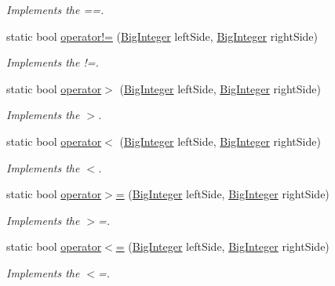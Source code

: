 \begin{DoxyCompactItemize}
\begin{DoxyCompactList}\small\item\em Implements the ==. \end{DoxyCompactList}\item 
static bool \hyperlink{class_scott_garland_1_1_big_integer_a55d1606d8b5694c6f6cd69aa658e1ad6}{operator!=} (\hyperlink{class_scott_garland_1_1_big_integer}{Big\+Integer} left\+Side, \hyperlink{class_scott_garland_1_1_big_integer}{Big\+Integer} right\+Side)
\begin{DoxyCompactList}\small\item\em Implements the !=. \end{DoxyCompactList}\item 
static bool \hyperlink{class_scott_garland_1_1_big_integer_a3d6351f6e8a56bb19b48fa232308f0b2}{operator$>$} (\hyperlink{class_scott_garland_1_1_big_integer}{Big\+Integer} left\+Side, \hyperlink{class_scott_garland_1_1_big_integer}{Big\+Integer} right\+Side)
\begin{DoxyCompactList}\small\item\em Implements the $>$. \end{DoxyCompactList}\item 
static bool \hyperlink{class_scott_garland_1_1_big_integer_aff57d146e2a3e57c5a291b45bbb25636}{operator$<$} (\hyperlink{class_scott_garland_1_1_big_integer}{Big\+Integer} left\+Side, \hyperlink{class_scott_garland_1_1_big_integer}{Big\+Integer} right\+Side)
\begin{DoxyCompactList}\small\item\em Implements the $<$. \end{DoxyCompactList}\item 
static bool \hyperlink{class_scott_garland_1_1_big_integer_ab8fca82975dcac550a798d63ee147133}{operator$>$=} (\hyperlink{class_scott_garland_1_1_big_integer}{Big\+Integer} left\+Side, \hyperlink{class_scott_garland_1_1_big_integer}{Big\+Integer} right\+Side)
\begin{DoxyCompactList}\small\item\em Implements the $>$=. \end{DoxyCompactList}\item 
static bool \hyperlink{class_scott_garland_1_1_big_integer_aeed3d904b36d585e151be95cd12e798a}{operator$<$=} (\hyperlink{class_scott_garland_1_1_big_integer}{Big\+Integer} left\+Side, \hyperlink{class_scott_garland_1_1_big_integer}{Big\+Integer} right\+Side)
\begin{DoxyCompactList}\small\item\em Implements the $<$=. \end{DoxyCompactList}\item 

\end{DoxyCompactItemize}
